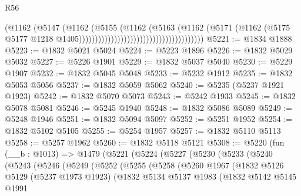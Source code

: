 \begin{lexlean}{R56}
\begin{coremodule}
                                                              (@1162
                                                                (@5147
                                                                  (@1162
                                                                    (@5155
                                                                      (@1162
                                                                        (@5163
                                                                          (@1162
                                                                            (@5171
                                                                              (@1162
                                                                                (@5175
                                                                                  @5177
                                                                                  @1218
                                                                                  @1405)))))))))))))))))))))))))))))))))))))))
@5221 := @1834 @1888
@5223 := @1832 @5021 @5024
@5224 := @5223 @1896
@5226 := @1832 @5029 @5032
@5227 := @5226 @1901
@5229 := @1832 @5037 @5040
@5230 := @5229 @1907
@5232 := @1832 @5045 @5048
@5233 := @5232 @1912
@5235 := @1832 @5053 @5056
@5237 := @1832 @5059 @5062
@5240 := @5235 (@5237 @1921 @1923)
@5242 := @1832 @5070 @5073
@5243 := @5242 @1933
@5245 := @1832 @5078 @5081
@5246 := @5245 @1940
@5248 := @1832 @5086 @5089
@5249 := @5248 @1946
@5251 := @1832 @5094 @5097
@5252 := @5251 @1952
@5254 := @1832 @5102 @5105
@5255 := @5254 @1957
@5257 := @1832 @5110 @5113
@5258 := @5257 @1962
@5260 := @1832 @5118 @5121
@5308 := @5220
    (fun (__b : @1013) =>
    @1479
      (@5221
        (@5224
          (@5227
            (@5230
              (@5233
                (@5240
                  (@5243
                    (@5246
                      (@5249
                        (@5252
                          (@5255
                            (@5258
                              (@5260
                                @1967
                                (@1832
                                  @5126
                                  @5129
                                  (@5237 @1973 @1923)
                                  (@1832
                                    @5134
                                    @5137
                                    @1983
                                    (@1832
                                      @5142
                                      @5145
                                      @1991

\end{coremodule}
\end{lexlean}
